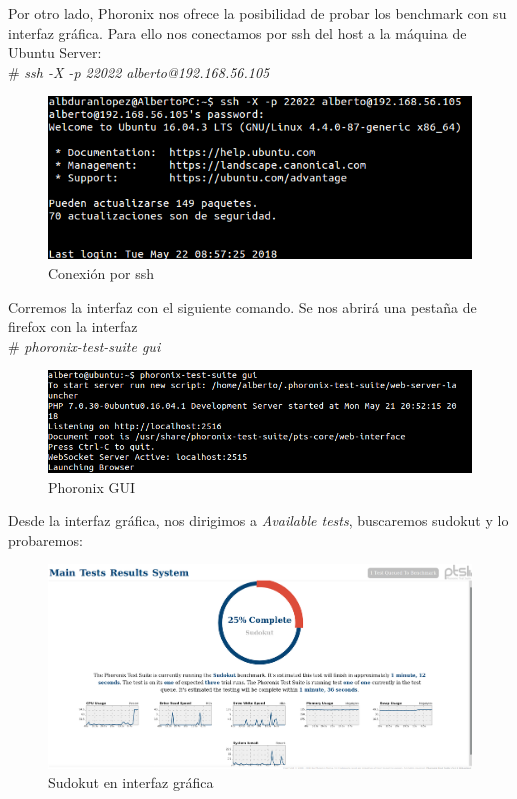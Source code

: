 Por otro lado, Phoronix nos ofrece la posibilidad de probar los benchmark con 
su interfaz gráfica. Para ello nos conectamos por ssh del host a la máquina de Ubuntu Server:\\
\# \textit{ssh -X -p 22022 alberto@192.168.56.105} \\
\begin{figure}[h]
	\centering
	\includegraphics[scale=0.5]{images/ssh.png}
	\caption{Conexión por ssh}
\end{figure}

\newpage
Corremos la interfaz con el siguiente comando. Se nos abrirá una pestaña de firefox con la
interfaz \\
\# \textit{phoronix-test-suite gui} 

\begin{figure}[h]
	\centering
	\includegraphics[scale=0.5]{images/gui.png}
	\caption{Phoronix GUI}
\end{figure}


Desde la interfaz gráfica, nos dirigimos a \textit{Available tests}, buscaremos sudokut y lo probaremos:

\begin{figure}[h]
	\centering
	\includegraphics[scale=0.25]{images/sudokut.png}
	\caption{Sudokut en interfaz gráfica}
\end{figure}


